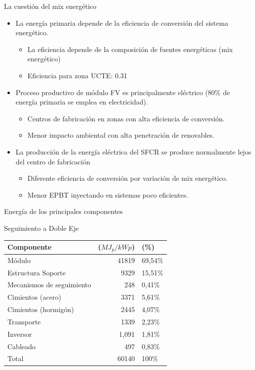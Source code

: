 \documentclass[xcolor={usenames,svgnames,dvipsnames}]{beamer}
\begin{document}
\begin{frame}[label={sec:org61dcb38}]{La cuestión del mix energético}
\begin{itemize}
\item \alert{La energía primaria depende de la eficiencia de conversión del
sistema energético.}

\begin{itemize}
\item La eficiencia depende de la composición de fuentes energéticas
(mix energético)

\item Eficiencia para zona UCTE: 0.31
\end{itemize}

\item \alert{Proceso productivo de módulo FV es principalmente eléctrico} (80\% de
energía primaria se emplea en electricidad).

\begin{itemize}
\item Centros de fabricación en zonas con alta eficiencia de conversión.

\item Menor impacto ambiental con alta penetración de renovables.
\end{itemize}

\item La \alert{producción de la energía eléctrica} del SFCR se produce
normalmente \alert{lejos del centro de fabricación}

\begin{itemize}
\item Diferente eficiencia de conversión por variación de mix
energético.

\item Menor EPBT inyectando en sistemas poco eficientes.
\end{itemize}
\end{itemize}
\end{frame}

\begin{frame}[label={sec:org677dde0}]{Energía de los principales componentes}
\begin{block}{Seguimiento a Doble Eje}
\begin{center}
\begin{tabular}{lrl}
Componente & (\(MJ_{p}/kWp\)) & (\%)\\
\hline
Módulo & 41819 & 69,54\%\\
Estructura Soporte & 9329 & 15,51\%\\
Mecanismos de seguimiento & 248 & 0,41\%\\
Cimientos (acero) & 3371 & 5,61\%\\
Cimientos (hormigón) & 2445 & 4,07\%\\
Transporte & 1339 & 2,23\%\\
Inversor & 1,091 & 1,81\%\\
Cableado & 497 & 0,83\%\\
Total & 60140 & 100\%\\
\end{tabular}
\end{center}
\end{block}
\end{frame}
\end{document}

